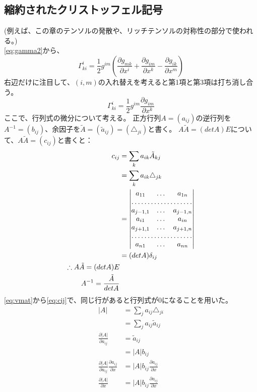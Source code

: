 \documentclass{jsarticle}
\begin{document}
\subsection{縮約されたクリストッフェル記号}
(例えば、この章のテンソルの発散や、リッチテンソルの対称性の部分で使われる。)\\
\eqref{eq:gamma2}から、
\begin{equation}
    \Gamma^{i}_{ki} =
    \frac{1}{2}g^{im} 
    \left(
    \frac{\partial{g_{mk}}}{\partial{x^{i}}}
     +
    \frac{\partial{g_{im}}}{\partial{x^{k}}}
     -
    \frac{\partial{g_{ik}}}{\partial{x^{m}}}
    \right)
\end{equation}
右辺だけに注目して、$(i, m)$の入れ替えを考えると第1項と第3項は打ち消し合う。%
\begin{equation}
    \Gamma^{i}_{ki} =
    \frac{1}{2}g^{im} 
    \frac{\partial{g_{im}}}{\partial{x^{k}}}\label{eq:gammaiki}
\end{equation}
ここで、行列式の微分について考える。
正方行列$A=(a_{ij})$の逆行列を$A^{-1}=(b_{ij})$、余因子を$\tilde{A}=(\tilde{a}_{ij})=(\triangle_{ji})$と書く。
$A\tilde{A}=(detA)E$について、$A\tilde{A} = (c_{ij})$と書くと：
\begin{align}
    c_{ij} &= \sum_{k}a_{ik}\tilde{A}_{kj}\\
           &= \sum_{k}a_{ik}\triangle_{jk}\\
           &= \begin{vmatrix}
                a_{11} & \dots & a_{1n}\\
                \hdotsfor{3}\\
                a_{j-1,1} & \dots & a_{j-1,n}\\
                a_{i1} & \dots & a_{in}\\
                a_{j+1,1} & \dots & a_{j+1,n}\\
                \hdotsfor{3}\\
                a_{n1} & \dots & a_{nn}
            \end{vmatrix}\label{eq:vmat}\\
           &= (detA)\delta_{ij}\label{eq:cij}\\
    \therefore A\tilde{A}=(detA)E\\
    A^{-1} = \frac{\tilde{A}}{detA}
\end{align}
\eqref{eq:vmat}から\eqref{eq:cij}で、同じ行があると行列式が0になることを用いた。
\begin{align}
    |A| &= \sum_{j}a_{ij}\triangle_{ji}\\
        &= \sum_{j}a_{ij}\tilde{a}_{ij}\\
    \frac{\partial{|A|}}{\partial{a_{ij}}} &= \tilde{a}_{ij}\\
                                           &= |A|b_{ij}\\
    \frac{\partial{|A|}}{\partial{a_{ij}}}\frac{\partial{a_{ij}}}{\partial{x}} &= |A|b_{ij}\frac{\partial{a_{ij}}}{\partial{x}}\\
    \frac{\partial{|A|}}{\partial{x}} &= |A|b_{ij}\frac{\partial{a_{ij}}}{\partial{x}}
\end{align}
\end{document}
